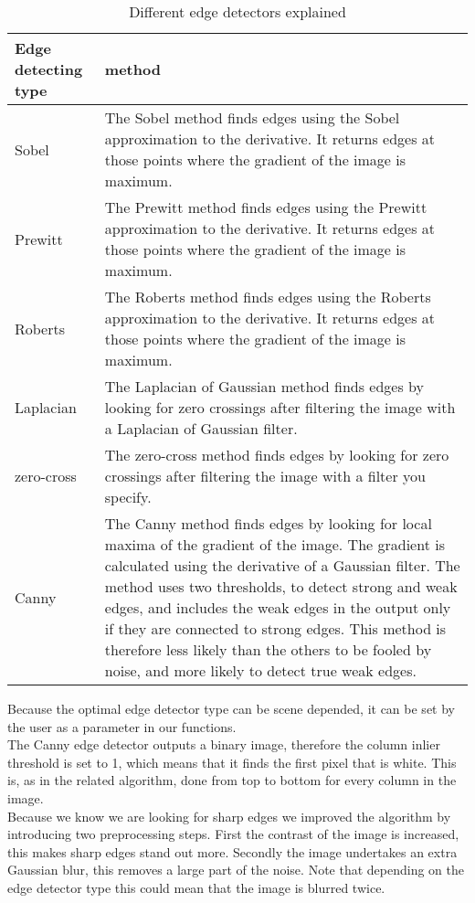 \begin{table}[ht]
\caption{Different edge detectors explained}
\label{tab:edge}
\begin{tabular}{|l|p{8cm}|}
	\hline
	Edge detecting type		& method\\
	\hline
	\hline
	Sobel					& The Sobel method finds edges using the Sobel
	approximation to the derivative. It returns edges at those points where the
	gradient of the image is maximum.\\
	\hline
	Prewitt					& The Prewitt method finds edges using the Prewitt
	approximation to the derivative. It returns edges at those points where the
	gradient of the image is maximum.\\
	\hline
	Roberts					& The Roberts method finds edges using the Roberts
	approximation to the derivative. It returns edges at those points where the
	gradient of the image is maximum.\\
	\hline
	Laplacian				& The Laplacian of Gaussian method finds edges by
	looking for zero crossings after filtering the image with a Laplacian of Gaussian
	filter.\\
	\hline
	zero-cross				& The zero-cross method finds edges by looking for zero
	crossings after filtering the image with a filter you specify.\\
	\hline
	Canny					& The Canny method finds edges by looking for local
	maxima of the gradient of the image. The gradient is calculated using the derivative of
	a Gaussian filter. The method uses two thresholds, to detect strong and weak
	edges, and includes the weak edges in the output only if they are connected to
	strong edges. This method is therefore less likely than the others to be fooled
	by noise, and more likely to detect true weak edges.\\
	\hline
\end{tabular}
\end{table}
\clearpage
Because the optimal edge detector type can be scene depended, it can be set
by the user as a parameter in our functions.\\

The Canny edge detector outputs a binary image, therefore the column inlier
threshold is set to 1, which means that it finds the first pixel that is white. 
This is, as in the related algorithm, done from top to bottom for every column in
the image.\\

Because we know we are looking for sharp edges we improved the algorithm by
introducing two preprocessing steps. First the contrast of the image is
increased, this makes sharp edges stand out more.  Secondly the image undertakes
an extra Gaussian blur, this removes a large part of the noise. Note that
depending on the edge detector type this could mean that the image is blurred
twice.\\

